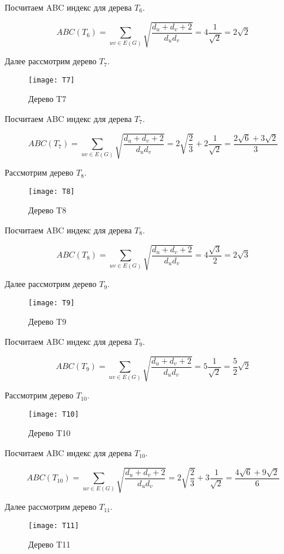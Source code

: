 \documentclass{article}
\begin{document}
Посчитаем ABC индекс для дерева $T_6$.

$$ ABC(T_6) = \sum_{uv \in E(G)} \sqrt{\frac{d_u + d_v + 2}{d_u d_v}} = 4 \frac{1}{\sqrt{2}} = 2 \sqrt{2} $$

Далее рассмотрим дерево $T_7$.

\begin{figure}[h]
\texttt{[image: T7]}
\centering
\caption{Дерево T7}
\end{figure}

Посчитаем ABC индекс для дерева $T_7$.

$$ ABC(T_7) = \sum_{uv \in E(G)} \sqrt{\frac{d_u + d_v + 2}{d_u d_v}} = 2 \sqrt{\frac{2}{3}} + 2 \frac{1}{\sqrt{2}} = \frac{2\sqrt{6} + 3 \sqrt{2}}{3} $$


Рассмотрим дерево $T_8$.

\begin{figure}[h]
\texttt{[image: T8]}
\centering
\caption{Дерево T8}
\end{figure}

Посчитаем ABC индекс для дерева $T_8$.

$$ ABC(T_8) = \sum_{uv \in E(G)} \sqrt{\frac{d_u + d_v + 2}{d_u d_v}} = 4 \frac{\sqrt{3}}{2} = 2 \sqrt{3}  $$


Далее рассмотрим дерево $T_9$.

\begin{figure}[h]
\texttt{[image: T9]}
\centering
\caption{Дерево T9}
\end{figure}

Посчитаем ABC индекс для дерева $T_9$.

$$ ABC(T_9) = \sum_{uv \in E(G)} \sqrt{\frac{d_u + d_v + 2}{d_u d_v}} = 5 \frac{1}{\sqrt{2}} = \frac{5}{2} \sqrt{2}  $$



Рассмотрим дерево $T_{10}$.

\begin{figure}[h]
\texttt{[image: T10]}
\centering
\caption{Дерево T10}
\end{figure}

Посчитаем ABC индекс для дерева $T_{10}$.

$$ ABC(T_{10}) = \sum_{uv \in E(G)} \sqrt{\frac{d_u + d_v + 2}{d_u d_v}} = 2 \sqrt{\frac{2}{3}} + 3 \frac{1}{\sqrt{2}} =
\frac{4 \sqrt{6} + 9 \sqrt{2}}{6} $$


Далее рассмотрим дерево $T_{11}$.

\begin{figure}[h]
\texttt{[image: T11]}
\centering
\caption{Дерево T11}
\end{figure}
\end{document}

